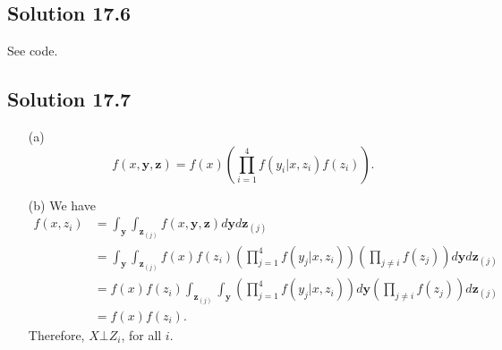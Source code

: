 \subsection*{Solution 17.6}

See code.


\subsection*{Solution 17.7}

\begin{itemize}
    \item[(a)]
        \begin{equation*}
            f(x, \bm{y}, \bm{z}) = f(x) \left(\prod_{i = 1}^4 f(y_i|x, z_i) f(z_i) \right).
        \end{equation*}
    \item[(b)] We have
        \begin{equation*}
            \begin{split}
                f(x, z_i)
                    &= \int_{\bm{y}} \int_{\bm{z}_{(j)}} f(x, \bm{y}, \bm{z}) d\bm{y} d\bm{z}_{(j)} \\
                    &= \int_{\bm{y}} \int_{\bm{z}_{(j)}}
                            f(x) f(z_i)
                            \left(\prod_{j = 1}^4 f(y_j|x, z_i) \right)
                            \left(\prod_{j \neq i} f(z_j) \right)
                        d\bm{y} d\bm{z}_{(j)} \\
                    &= f(x) f(z_i)
                            \int_{\bm{z}_{(j)}} \int_{\bm{y}}
                                \left(\prod_{j = 1}^4 f(y_j|x, z_i) \right)
                            d\bm{y}
                        \left(\prod_{j \neq i} f(z_j) \right) d\bm{z}_{(j)} \\
                    &= f(x) f(z_i).
            \end{split}
        \end{equation*}
    Therefore, $X \bot Z_i$, for all $i$.
\end{itemize}
